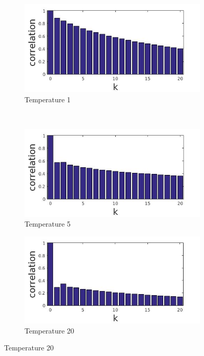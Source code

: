 \documentclass[12pt]{report}
\begin{document}
\begin{figure}[t]
    \centering
    \begin{subfigure}[b]{0.4\textwidth}
        \includegraphics[width=\textwidth]{rggT1corr}
        \caption{Temperature 1}

    \end{subfigure}
	~ 
    \begin{subfigure}[b]{0.4\textwidth}
        \includegraphics[width=\textwidth]{rggT5corr}
        \caption{Temperature 5}

    \end{subfigure}

    \begin{subfigure}[b]{0.4\textwidth}
        \includegraphics[width=\textwidth]{rggT20corr}
        \caption{Temperature 20}


\end{subfigure}
\end{figure}
\end{document}

